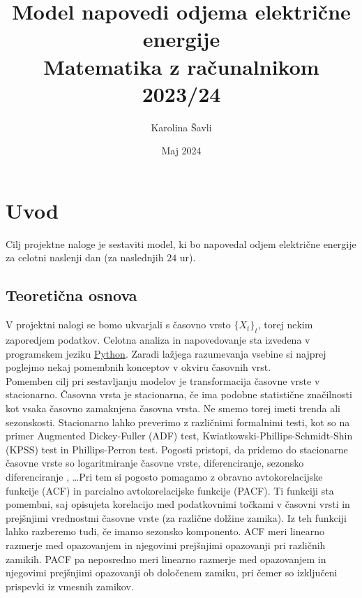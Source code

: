 \documentclass[a4paper, 11pt]{article}
\begin{document}
\title{\textbf{\LARGE{Model napovedi odjema električne energije}} \\ Matematika z računalnikom 2023/24}
\author{Karolina Šavli}
\date{Maj 2024}

\maketitle



\section{Uvod}

Cilj projektne naloge je sestaviti model, ki bo napovedal odjem električne energije 
za celotni naslenji dan (za naslednjih $24$ ur). \\


\subsection{Teoretična osnova}

\noindent V projektni nalogi se bomo ukvarjali s časovno vrsto $\{X_t\}_t$, torej nekim zaporedjem podatkov. 
Celotna analiza in napovedovanje 
sta izvedena v programskem jeziku \href{https://www.python.org/}{Python}. Zaradi lažjega razumevanja vsebine si najprej poglejmo
nekaj pomembnih konceptov v okviru časovnih vrst. \\

\noindent Pomemben cilj pri sestavljanju modelov je transformacija časovne vrste v stacionarno.
Časovna vrsta je stacionarna, če ima podobne statistične značilnosti kot vsaka časovno zamaknjena časovna vrsta. 
Ne smemo torej imeti trenda ali sezonskosti.
Stacionarno lahko preverimo z različnimi formalnimi testi, kot so na primer Augmented Dickey-Fuller (ADF) test,
Kwiatkowski-Phillips-Schmidt-Shin (KPSS) test in Phillips-Perron test. \cite{Stacionarity_V,Brilej_2021} 
Pogosti pristopi, da pridemo do stacionarne časovne vrste so logaritmiranje časovne vrste, diferenciranje,
sezonsko diferenciranje , \dots Pri tem si pogosto pomagamo z obravno 
avtokorelacijske funkcije (ACF) in parcialno avtokorelacijske funkcije (PACF). 
Ti funkciji sta pomembni, saj opisujeta korelacijo med podatkovnimi točkami v časovni vrsti in prejšnjimi vrednostmi 
časovne vrste (za različne dolžine zamika). Iz teh funkciji lahko razberemo tudi, če imamo sezonsko komponento.
ACF meri linearno razmerje med opazovanjem in njegovimi prejšnjimi opazovanji pri različnih zamikih. 
PACF pa neposredno meri linearno razmerje med opazovanjem in njegovimi prejšnjimi opazovanji ob določenem zamiku, 
pri čemer so izključeni prispevki iz vmesnih zamikov. \\
\end{document}
